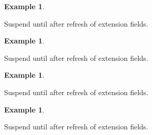 \documentclass{article}
\newtheorem{example}[theorem]{Example}
\begin{document}
\begin{example}
\end{example}
Suspend until after refresh of extension fields.

\begin{example}
\end{example}
Suspend until after refresh of extension fields.

\begin{example}
\end{example}
Suspend until after refresh of extension fields.

\begin{example}
\end{example}
Suspend until after refresh of extension fields.
\end{document}
